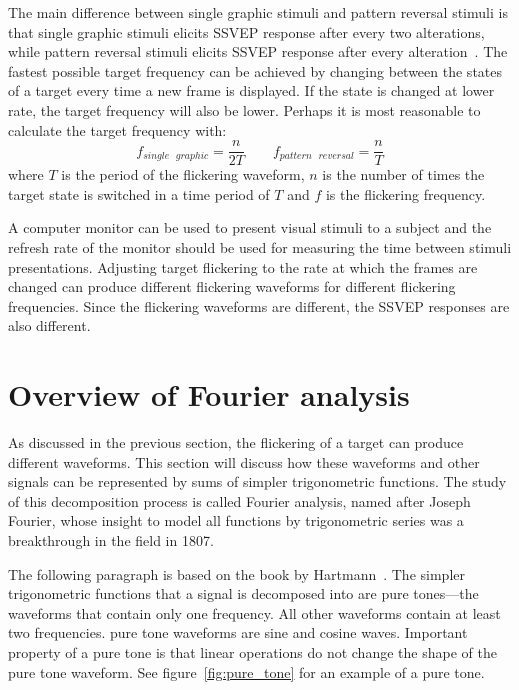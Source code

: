 The main difference between \gls{single graphic} stimuli and \gls{pattern reversal} stimuli is that \gls{single graphic} stimuli elicits \gls{SSVEP} response after every two alterations, while \gls{pattern reversal} stimuli elicits \gls{SSVEP} response after every alteration~\cite{ssvep_stim}. The fastest possible target frequency can be achieved by changing between the \glspl{state} of a target every time a new \gls{frame} is displayed. If the \gls{state} is changed at lower rate, the \gls{target} frequency will also be lower. Perhaps it is most reasonable to calculate the \gls{target} frequency with:
\begin{equation}
	f_{single\mbox{ }graphic} = \frac{n}{2T} \qquad f_{pattern\mbox{ }reversal} = \frac{n}{T}
\end{equation}
where $T$ is the period of the \gls{flickering waveform}, $n$ is the number of times the \gls{target} \gls{state} is switched in a time period of $T$ and $f$ is the \gls{flickering} frequency.

A computer monitor can be used to present visual stimuli to a subject and the \gls{refresh rate} of the monitor should be used for measuring the time between stimuli presentations. Adjusting \gls{target} \gls{flickering} to the rate at which the \glspl{frame} are changed can produce different \glspl{flickering waveform} for different \gls{flickering} frequencies. Since the \glspl{flickering waveform} are different, the \gls{SSVEP} responses are also different.

\section{Overview of Fourier analysis}
\label{sec:fourier}

As discussed in the previous section, the \gls{flickering} of a \gls{target} can produce different waveforms. This section will discuss how these waveforms and other signals can be represented by sums of simpler trigonometric functions. The study of this decomposition process is called Fourier analysis, named after Joseph Fourier, whose insight to model all functions by trigonometric series was a breakthrough in the field in 1807.

The following paragraph is based on the book by Hartmann~\cite{pure_tone}. The simpler trigonometric functions that a signal is decomposed into are \glspl{pure tone}---the waveforms that contain only one frequency. All other waveforms contain at least two frequencies. \Gls{pure tone} waveforms are sine and cosine waves. Important property of a \gls{pure tone} is that linear operations do not change the shape of the \gls{pure tone} waveform. See figure~\ref{fig:pure_tone} for an example of a \gls{pure tone}.


